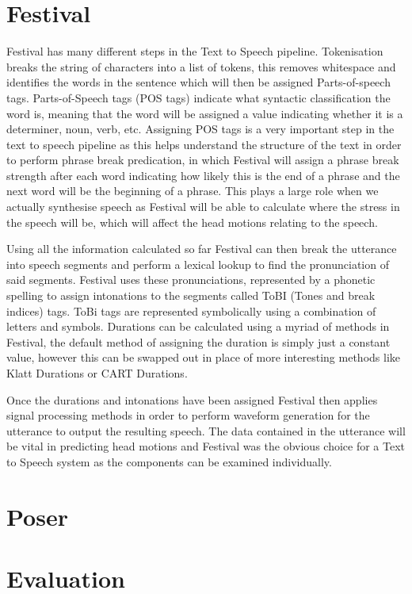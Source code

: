\documentclass[bsc,frontabs,twoside,singlespacing,parskip]{infthesis}
\begin{document}
\section{Festival}
Festival has many different steps in the Text to Speech pipeline. Tokenisation breaks the string of characters into a list of tokens, this removes whitespace and identifies the words in the sentence which will then be assigned Parts-of-speech tags. Parts-of-Speech tags (POS tags) indicate what syntactic classification the word is, meaning that the word will be assigned a value indicating whether it is a determiner, noun, verb, etc. Assigning POS tags is a very important step in the text to speech pipeline as this helps understand the structure of the text in order to perform phrase break predication, in which Festival will assign a phrase break strength after each word indicating how likely this is the end of a phrase and the next word will be the beginning of a phrase. This plays a large role when we actually synthesise speech as Festival will be able to calculate where the stress in the speech will be, which will affect the head motions relating to the speech.

Using all the information calculated so far Festival can then break the utterance into speech segments and perform a lexical lookup to find the pronunciation of said segments. Festival uses these pronunciations, represented by a phonetic spelling to assign intonations to the segments called ToBI (Tones and break indices) tags. ToBi tags are represented symbolically using a combination of letters and symbols. Durations can be calculated using a myriad of methods in Festival, the default method of assigning the duration is simply just a constant value, however this can be swapped out in place of more interesting methods like Klatt Durations or CART Durations. 

Once the durations and intonations have been assigned Festival then applies signal processing methods in order to perform waveform generation for the utterance to output the resulting speech. The data contained in the utterance will be vital in predicting head motions and Festival was the obvious choice for a Text to Speech system as the components can be examined individually.


\section{Poser}

\section{Evaluation}
\end{document}
